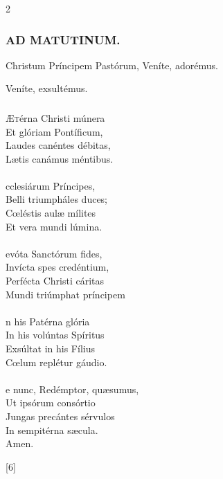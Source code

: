 \documentclass[9pt,twoside]{extarticle}
\begin{document}
\begin{multicols}{2}
\subsubsection*{\center \textsc{AD MATUTINUM.}}
\begin{tightlist}{}
\item {} Christum Príncipem Pastórum, \textred{*} Veníte, adorémus.
\item {} Veníte, exsultémus.
\end{tightlist}

\subsubsection*{\center {}}
\lettrine{Æ}térna Christi múnera\\
Et glóriam Pontíficum,\\
Laudes canéntes débitas,\\
Lætis canámus méntibus.\\
\\
cclesiárum Príncipes,\\
Belli triumpháles duces;\\
Cœléstis aulæ mílites\\
Et vera mundi lúmina.\\
\\
evóta Sanctórum fides,\\
Invícta spes credéntium,\\
Perfécta Christi cáritas\\
Mundi triúmphat príncipem\\
\\
n his Patérna glória\\
In his volúntas Spíritus\\
Exsúltat in his Fílius\\
Cœlum replétur gáudio.\\
\\
e nunc, Redémptor, quæsumus,\\
Ut ipsórum consórtio\\
Jungas precántes sérvulos\\
In sempitérna sæcula.\\
Amen.

\begin{tightlist}{}
\item {} [6]
\end{tightlist}


\end{multicols}
\end{document}
